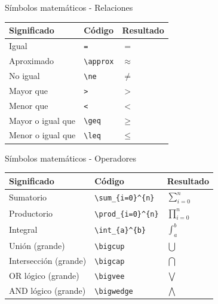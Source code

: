 \documentclass[
  ignorenonframetext,
  aspectratio=169]{beamer}
\begin{document}
\begin{frame}[fragile]{Símbolos matemáticos - Relaciones}
\protect\hypertarget{suxedmbolos-matemuxe1ticos---relaciones}{}
\begin{longtable}[]{@{}lll@{}}
\toprule()
Significado & Código & Resultado \\
\midrule()
\endhead
Igual & \texttt{=} & \(=\) \\
Aproximado & \texttt{\textbackslash{}approx} & \(\approx\) \\
No igual & \texttt{\textbackslash{}ne} & \(\ne\) \\
Mayor que & \texttt{\textgreater{}} & \(>\) \\
Menor que & \texttt{\textless{}} & \(<\) \\
Mayor o igual que & \texttt{\textbackslash{}geq} & \(\geq\) \\
Menor o igual que & \texttt{\textbackslash{}leq} & \(\leq\) \\
\bottomrule()
\end{longtable}
\end{frame}

\begin{frame}[fragile]{Símbolos matemáticos - Operadores}
\protect\hypertarget{suxedmbolos-matemuxe1ticos---operadores}{}
\begin{longtable}[]{@{}lll@{}}
\toprule()
Significado & Código & Resultado \\
\midrule()
\endhead
Sumatorio & \texttt{\textbackslash{}sum\_\{i=0\}\^{}\{n\}} &
\(\sum_{i=0}^{n}\) \\
Productorio & \texttt{\textbackslash{}prod\_\{i=0\}\^{}\{n\}} &
\(\prod_{i=0}^{n}\) \\
Integral & \texttt{\textbackslash{}int\_\{a\}\^{}\{b\}} &
\(\int_{a}^{b}\) \\
Unión (grande) & \texttt{\textbackslash{}bigcup} & \(\bigcup\) \\
Intersección (grande) & \texttt{\textbackslash{}bigcap} & \(\bigcap\) \\
OR lógico (grande) & \texttt{\textbackslash{}bigvee} & \(\bigvee\) \\
AND lógico (grande) & \texttt{\textbackslash{}bigwedge} &
\(\bigwedge\) \\
\bottomrule()
\end{longtable}
\end{frame}
\end{document}
